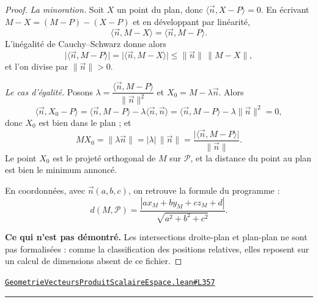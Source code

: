 \documentclass[11pt,a4paper]{article}
\theoremstyle{definition}
\theoremstyle{plain}
\newcommand{\source}[2]{\par\smallskip\noindent\hfill{\footnotesize\href{#1}{\texttt{#2}}}\par\smallskip}
\begin{document}
\begin{proof}
\emph{La minoration.} Soit $X$ un point du plan, donc
$\langle \vec n, X - P\rangle = 0$. En écrivant $M - X = (M - P) - (X - P)$ et en
développant par linéarité,
\[ \langle \vec n, M - X\rangle = \langle \vec n, M - P\rangle . \]
L'inégalité de Cauchy--Schwarz donne alors
\[ \bigl|\langle \vec n, M - P\rangle\bigr| = \bigl|\langle \vec n, M - X\rangle\bigr|
   \le \|\vec n\|\,\|M - X\| , \]
et l'on divise par $\|\vec n\| > 0$.

\emph{Le cas d'égalité.} Posons
$\lambda = \dfrac{\langle \vec n, M - P\rangle}{\|\vec n\|^{2}}$ et
$X_0 = M - \lambda \vec n$. Alors
\[ \langle \vec n, X_0 - P\rangle
   = \langle \vec n, M - P\rangle - \lambda \langle \vec n, \vec n\rangle
   = \langle \vec n, M - P\rangle - \lambda \|\vec n\|^{2} = 0 , \]
donc $X_0$ est bien dans le plan ; et
\[ MX_0 = \|\lambda \vec n\| = |\lambda|\,\|\vec n\|
   = \frac{\bigl|\langle \vec n, M - P\rangle\bigr|}{\|\vec n\|} . \]
Le point $X_0$ est le projeté orthogonal de $M$ sur $\mathcal{P}$, et la distance du point
au plan est bien le minimum annoncé.

\medskip\noindent
En coordonnées, avec $\vec n(a, b, c)$, on retrouve la formule du programme :
\[ d(M, \mathcal{P})
   = \frac{|a x_M + b y_M + c z_M + d|}{\sqrt{a^{2} + b^{2} + c^{2}}} . \]

\medskip\noindent
\textbf{Ce qui n'est pas démontré.} Les intersections droite-plan et plan-plan ne sont pas
formalisées : comme la classification des positions relatives, elles reposent sur un calcul
de dimensions absent de ce fichier.
\end{proof}
\source{https://github.com/Commutator-IO/learn-lean/blob/main/cours/02-lycee/08-geometrie-vecteurs-produit-scalaire-espace/GeometrieVecteursProduitScalaireEspace.lean\#L357}{GeometrieVecteursProduitScalaireEspace.lean\#L357}

\vfill
\noindent\rule{0.35\linewidth}{0.4pt}\par
{}
\end{document}
